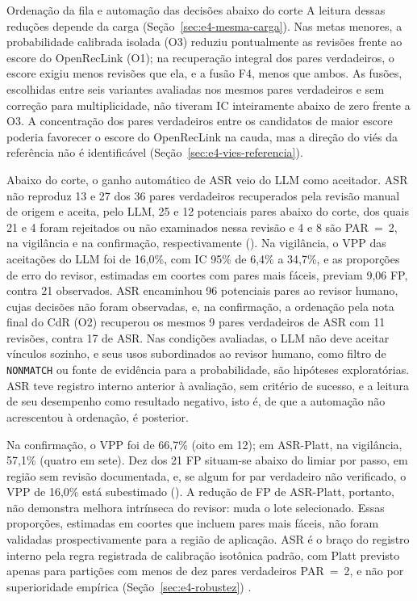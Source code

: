 \begin{chapter}{Ordenação da fila e automação das decisões abaixo do corte}
A leitura dessas reduções depende da carga (Seção~\ref{sec:e4-mesma-carga}). Nas metas menores, a probabilidade calibrada isolada (O3) reduziu pontualmente as revisões frente ao escore do OpenRecLink (O1); na recuperação integral dos pares verdadeiros, o escore exigiu menos revisões que ela, e a fusão F4, menos que ambos. As fusões, escolhidas entre seis variantes avaliadas nos mesmos pares verdadeiros e sem correção para multiplicidade, não tiveram IC inteiramente abaixo de zero frente a O3. A concentração dos pares verdadeiros entre os candidatos de maior escore poderia favorecer o escore do OpenRecLink na cauda, mas a direção do viés da referência não é identificável (Seção~\ref{sec:e4-vies-referencia}).

Abaixo do corte, o ganho automático de ASR veio do LLM como aceitador. ASR não reproduz 13 e 27 dos 36 pares verdadeiros recuperados pela revisão manual de origem e aceita, pelo LLM, 25 e 12 potenciais pares abaixo do corte, dos quais 21 e 4 foram rejeitados ou não examinados nessa revisão e 4 e 8 são PAR~=~2, na vigilância e na confirmação, respectivamente (). Na vigilância, o VPP das aceitações do LLM foi de 16,0\%, com IC 95\% de 6,4\% a 34,7\%, e as proporções de erro do revisor, estimadas em coortes com pares mais fáceis, previam 9,06 FP, contra 21 observados. ASR encaminhou 96 potenciais pares ao revisor humano, cujas decisões não foram observadas, e, na confirmação, a ordenação pela nota final do CdR (O2) recuperou os mesmos 9 pares verdadeiros de ASR com 11 revisões, contra 17 de ASR. Nas condições avaliadas, o LLM não deve aceitar vínculos sozinho, e seus usos subordinados ao revisor humano, como filtro de \texttt{NONMATCH} ou fonte de evidência para a probabilidade, são hipóteses exploratórias. ASR teve registro interno anterior à avaliação, sem critério de sucesso, e a leitura de seu desempenho como resultado negativo, isto é, de que a automação não acrescentou à ordenação, é posterior.

Na confirmação, o VPP foi de 66,7\% (oito em 12); em ASR-Platt, na vigilância, 57,1\% (quatro em sete). Dez dos 21 FP situam-se abaixo do limiar por passo, em região sem revisão documentada, e, se algum for par verdadeiro não verificado, o VPP de 16,0\% está subestimado (). A redução de FP de ASR-Platt, portanto, não demonstra melhora intrínseca do revisor: muda o lote selecionado. Essas proporções, estimadas em coortes que incluem pares mais fáceis, não foram validadas prospectivamente para a região de aplicação. ASR é o braço do registro interno pela regra registrada de calibração isotônica padrão, com Platt previsto apenas para partições com menos de dez pares verdadeiros PAR~=~2, e não por superioridade empírica (Seção~\ref{sec:e4-robustez}) \cite{Jardim2026phdrepo}.


\end{chapter}
